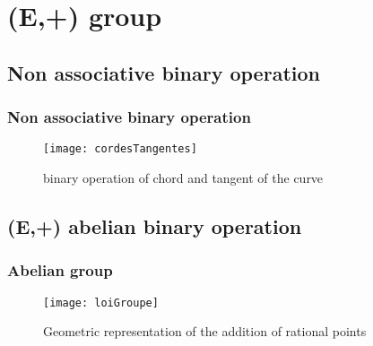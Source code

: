 \section{(E,+) group}

\subsection{Non associative binary operation}
\begin{frame}[t]
    \frametitle{Non associative binary operation}
    
    \begin{figure}[h]
        \centering
        \texttt{[image: cordesTangentes]}
        \caption{binary operation of chord and tangent of the curve}
        \label{fig:cordesTangentes}
    \end{figure}
\end{frame}

\subsection{(E,+) abelian binary operation}
\begin{frame}[t]
    \frametitle{Abelian group}
    \begin{figure}[h]
        \centering
        \texttt{[image: loiGroupe]}
        \caption{Geometric representation of the addition of rational points}
        \label{fig:loiGroupe}
    \end{figure}
\end{frame}
